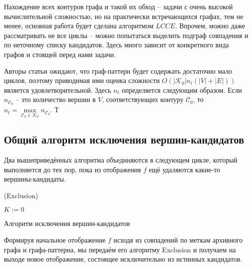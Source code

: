 Нахождение всех контуров графа и такой их обход -- задачи с очень высокой вычислительной сложностью, но на практически встречающихся графах, тем не менее, основная работа будет сделана алгоритмом $LCCE$. Впрочем, можно даже рассматривать не все циклы -- можно попытаться выделить подграф совпадения и по неточному списку кандидатов. Здесь много зависит от конкретного вида графов и стоящей перед нами задачи.

Авторы статьи \cite{patmat} ожидают, что граф-паттерн будет содержать достаточно мало циклов, поэтому приводимая ими оценка сложности $O(|\mathcal{K}_0|\allowbreak n_t \allowbreak (|V| + |E|))$ является удовлетворительной. Здесь $n_t$ определяется следующим образом. Если $n_{\mathcal{C}_0}$ -- это количество вершин в $V$, соответствующих контуру $\mathcal{C}_0$, то $n_t = \max\limits_{\mathcal{C}_0 \in \mathcal{K}_0} n_{\mathcal{C}_0}$. Т

\subsection{Общий алгоритм исключения вершин-кандидатов}

Два вышеприведённых алгоритма объединяются в следующем цикле, который выполняется до тех пор, пока из отображения $f$ ещё удаляются какие-то вершины-кандидаты.

\begin{algorithm}
	\Large
	\Begin(Exclusion){
		$K := 0$
		
	}

	\caption{Алгоритм исключения вершин-кандидатов}
	\label{alg:EE}
\end{algorithm}

Формируя начальное отображение $f$ исходя из совпадений по меткам архивного графа и графа-паттерна, мы передаём его алгоритму Exclusion и получаем на выходе новое отображение, состоящее исключительно из истинных кандидатов.
